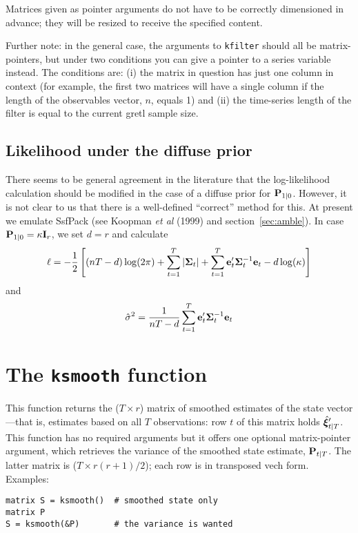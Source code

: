 \documentclass[a4paper]{article}
\newcommand{\statevec}{\ensuremath\mathbf{\bm \xi}}
\newcommand{\statevar}{\ensuremath\mathbf{P}}
\newcommand{\prederr}{\ensuremath\mathbf{e}}
\newcommand{\predvar}{\ensuremath{\bm\Sigma}}
\begin{document}
Matrices given as pointer arguments do not have to be correctly
dimensioned in advance; they will be resized to receive the specified
content.

Further note: in the general case, the arguments to \texttt{kfilter}
should all be matrix-pointers, but under two conditions you can give a
pointer to a series variable instead.  The conditions are: (i) the
matrix in question has just one column in context (for example, the
first two matrices will have a single column if the length of the
observables vector, $n$, equals 1) and (ii) the time-series length of
the filter is equal to the current gretl sample size.

\subsection{Likelihood under the diffuse prior}

There seems to be general agreement in the literature that the
log-likelihood calculation should be modified in the case of a diffuse
prior for $\statevar_{1|0}$.  However, it is not clear to us that
there is a well-defined ``correct'' method for this.  At present we
emulate \textsf{SsfPack} (see Koopman \textit{et al} (1999) and
section~\ref{sec:amble}).  In case $\statevar_{1|0} = \kappa
\mathbf{I}_r$, we set $d = r$ and calculate
%
\[
  \ell = -\frac{1}{2} \left[(nT-d) \log(2 \pi) + 
    \sum_{t=1}^T\left|\predvar_t\right| + 
    \sum_{t=1}^T\prederr_t'\predvar_t^{-1} \prederr_t
    - d \log(\kappa)
  \right]
\]
%
and
%
\[
\hat{\sigma}^2 = \frac{1}{nT-d} 
   \sum_{t=1}^T\prederr_t'\predvar_t^{-1} \prederr_t
\]

\section{The \texttt{ksmooth} function}

This function returns the ($T \times r$) matrix of smoothed estimates
of the state vector---that is, estimates based on all $T$
observations: row $t$ of this matrix holds $\hat{\statevec}_{t|T}'$.  This
function has no required arguments but it offers one optional
matrix-pointer argument, which retrieves the variance of the smoothed
state estimate, $\statevar_{t|T}$.  The latter matrix is ($T \times
r(r+1)/2$); each row is in transposed vech form.  Examples:
%
\begin{verbatim}
matrix S = ksmooth()  # smoothed state only
matrix P
S = ksmooth(&P)       # the variance is wanted
\end{verbatim}
\end{document}
